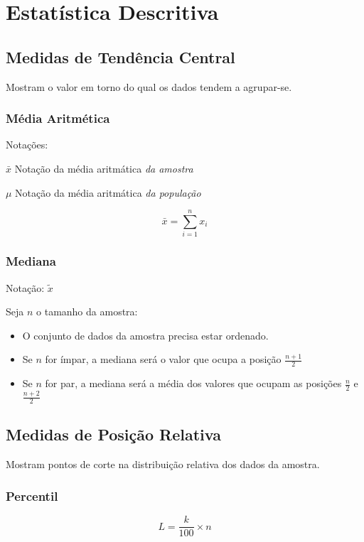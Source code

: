\chapter{Estatística Descritiva}

\section{Medidas de Tendência Central}

Mostram o valor em torno do qual os dados tendem a agrupar-se.

\subsection{Média Aritmética}

Notações:

\(\bar{x}\) Notação da média aritmática \emph{da amostra}

\(\mu\) Notação da média aritmática \emph{da população}

\[\bar{x} = \sum_{i=1}^{n} x_i \] 

\subsection{Mediana}

Notação: \(\tilde{x}\)

Seja \(n\) o tamanho da amostra:
\begin{itemize}
	\item O conjunto de dados da amostra precisa estar ordenado.
	\item Se \(n\) for ímpar, a mediana será o valor que ocupa a posição \(\frac{n + 1}{2}\)
	\item Se \(n\) for par, a mediana será a média dos valores que ocupam as posições \(\frac{n}{2}\) e \(\frac{n + 2}{2}\)
\end{itemize}

\section{Medidas de Posição Relativa}

Mostram pontos de corte na distribuição relativa dos dados da amostra.

\subsection{Percentil}

\[L = \frac{k}{100} \times n\]

